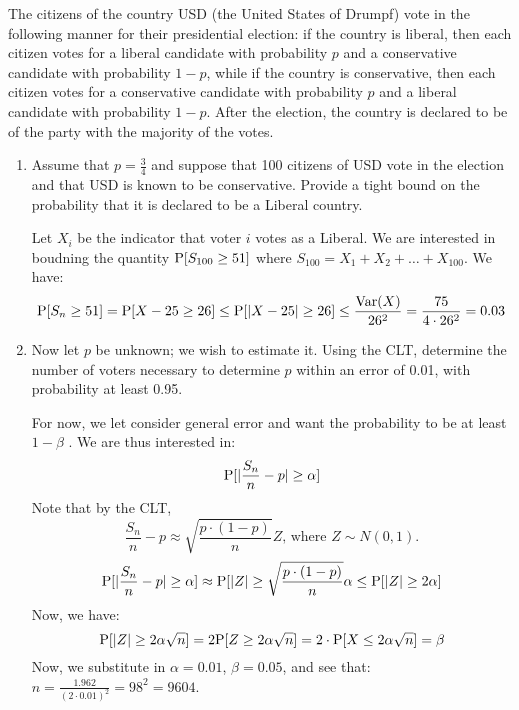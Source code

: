 \question The citizens of the country USD (the United States of Drumpf) 
vote in the following manner for their presidential election: if the 
country is liberal, then each citizen votes
for a liberal candidate with probability $p$ and a conservative candidate 
with probability $1-p$, while if the country is conservative, then 
each citizen votes for a conservative candidate with probability $p$ and 
a liberal candidate with probability $1-p$. After the
election, the country is declared to be of the party with the majority of the votes.
\begin{enumerate}[label=(\alph*)]
\item Assume that $p = \frac{3}{4}$ and suppose that 100 citizens of 
USD vote in the election and that USD is known to be conservative. 
Provide a tight bound on the probability that it is declared to be a 
Liberal country.
\begin{solution}[2cm]
Let $X_i$ be the indicator that voter $i$ votes as a Liberal. We are interested
in boudning the quantity $\P[S_{100} \geq 51]$ where $S_{100} = X_1 + X_2
+ \dotsc + X_{100}$. We have:
\[\P[S_n \geq 51] = \P[X-25 \geq 26] \leq \P[|X-25| \geq 26] \leq 
\frac{\var (X)}{26^2} = \frac{75}{4 \cdot 26^2} = 0.03\]
\end{solution}

\item Now let $p$ be unknown; we wish to estimate it. Using the CLT, determine the
number of voters necessary to determine $p$ within an error of 0.01, with probability
at least 0.95.
\begin{solution}[2 cm]
For now, we let consider general error and want the probability to
be at least $1 - \beta$ . We are thus interested in: 
\[\P[|\frac{S_n}{n} - p| \geq \alpha]\]
Note that by the CLT,
\[\frac{S_n}{n} - p \approx \sqrt{ \frac{p \cdot (1-p)}{n}}Z\text{, where }Z \sim N(0, 1).\]
\[\P[|\frac{S_n}{n} - p| \geq \alpha] \approx \P[|Z| \geq 
\sqrt{ \frac{p \cdot (1-p)}{n}} \alpha
\leq \P[|Z| \geq 2 \alpha]\]
Now, we have: 
\[\P[|Z| \geq 2\alpha \sqrt{n} ] = 2 \P[Z \geq 2 \alpha \sqrt{n}] = 2 \cdot
\P[X \leq 2 \alpha \sqrt{n}] = \beta\]
Now, we substitute in $\alpha = 0.01$, $\beta = 0.05$, and see that: 
$n = \frac{1.962}{(2 \cdot 0.01)^2} = 98^2 = 9604$.
\end{solution}
\end{enumerate}